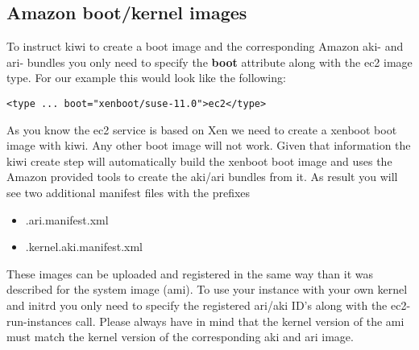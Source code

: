 \subsection{Amazon boot/kernel images}

To instruct kiwi to create a boot image and the corresponding
Amazon aki- and ari- bundles you only need to specify the \textbf{boot}
attribute along with the ec2 image type. For our example this
would look like the following:

\begin{Command}{12cm}
\begin{verbatim}
<type ... boot="xenboot/suse-11.0">ec2</type>
\end{verbatim}
\end{Command} 

As you know the ec2 service is based on Xen we need to create a
xenboot boot image with kiwi. Any other boot image will not work.
Given that information the kiwi create step will automatically
build the xenboot boot image and uses the Amazon provided tools
to create the aki/ari bundles from it. As result you will see
two additional manifest files with the prefixes

\begin{itemize}
\item <initrd-name>.ari.manifest.xml
\item <initrd-name>.kernel.aki.manifest.xml
\end{itemize}

These images can be uploaded and registered in the same way than
it was described for the system image (ami). To use your instance
with your own kernel and initrd you only need to specify the
registered ari/aki ID's along with the ec2-run-instances call.
Please always have in mind that the kernel version of the ami must
match the kernel version of the corresponding aki and ari image.
